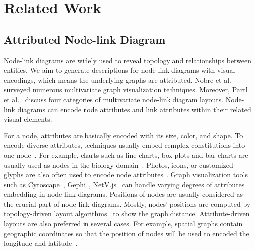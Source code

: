 \section{Related Work}\label{sec:relatedwork}
\subsection{Attributed Node-link Diagram}
Node-link diagrams are widely used to reveal topology and relationships between entities.
We aim to generate descriptions for node-link diagrams with visual encodings, which means the underlying graphs are attributed.
Nobre et al.~\cite{DBLP:journals/cgf/NobreMSL19} surveyed numerous multivariate graph visualization techniques.
Moreover, Partl et al.~\cite{DBLP:conf/biovis/PartlKLKSS12} discuss four categories of multivariate node-link diagram layouts.
Node-link diagrams can encode node attributes and link attributes within their related visual elements.

For a node, attributes are basically encoded with its size, color, and shape.
To encode diverse attributes, techniques usually embed complex constitutions into one node~\cite{DBLP:conf/infovis/AuberCJM03}.
For example, charts such as line charts, box plots and bar charts are usually used as nodes in the biology domain~\cite{gehlenborg2010visualization, DBLP:conf/iv/JusufiDK10}.
Photos, icons, or customized glyphs are also often used to encode node attributes~\cite{DBLP:conf/chi/DunneS13}.
Graph visualization tools such as Cytoscape~\cite{DBLP:journals/bioinformatics/FranzLHDSB16}, Gephi~\cite{DBLP:conf/icwsm/BastianHJ09}, NetV.js~\cite{HAN2021} can handle varying degrees of attributes embedding in node-link diagrams.
Positions of nodes are usually considered as the crucial part of node-link diagrams.
Mostly, nodes' positions are computed by topology-driven layout algorithms~\cite{DBLP:journals/spe/FruchtermanR91, DBLP:journals/cgf/KruigerRMKKT17, DBLP:journals/tvcg/GansnerHN13, DBLP:journals/tvcg/ZhuCHHLZ21} to show the graph distance.
Attribute-driven layouts are also preferred in several cases.
For example, spatial graphs contain geographic coordinates so that the position of nodes will be used to encoded the longitude and latitude~\cite{DBLP:journals/tvcg/ElzenW14, DBLP:journals/tvcg/Guo09}.

